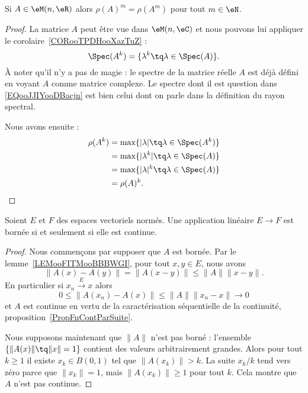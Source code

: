 \begin{proposition}     \label{PROPooYPLGooWKLbPA}
    Si \( A\in \eM(n,\eR)\) alors \( \rho(A)^m=\rho(A^m)\) pour tout \( m\in \eN\).
\end{proposition}

\begin{proof}
    La matrice \( A\) peut être vue dans \( \eM(n,\eC)\) et nous pouvons lui appliquer le corolaire~\ref{CORooTPDHooXazTuZ} :
    \begin{equation}        \label{EQooJJIYooDBacjn}
        \Spec(A^k)=\{ \lambda^k\tq \lambda\in\Spec(A) \}.
    \end{equation}
    À noter qu'il n'y a pas de magie : le spectre de la matrice réelle \( A\) est déjà défini en voyant \( A\) comme matrice complexe. Le spectre dont il est question dans \eqref{EQooJJIYooDBacjn} est bien celui dont on parle dans la définition du rayon spectral.

    Nous avons ensuite :
    \begin{subequations}
        \begin{align}
            \rho(A^k)&=\max\{ | \lambda |\tq \lambda\in\Spec(A^k) \}\\
            &=\max\{ | \lambda^k |\tq \lambda\in\Spec(A) \}\\
            &=\max\{ | \lambda |^k\tq\lambda\in\Spec(A) \}\\
            &=\rho(A)^k.
        \end{align}
    \end{subequations}
\end{proof}

\begin{proposition}       \label{PROPooQZYVooYJVlBd}
    Soient \( E\) et \( F\) des espaces vectoriels normés. Une application linéaire \( E\to F\) est bornée si et seulement si elle est continue.
\end{proposition}

\begin{proof}
    Nous commençons par supposer que \( A\) est bornée. Par le lemme~\ref{LEMooFITMooBBBWGI}, pour tout \( x,y\in E\), nous avons
    \begin{equation}
        \| A(x)-A(y) \|=\| A(x-y) \|\leq \| A \|\| x-y \|.
    \end{equation}
    En particulier si \( x_n\stackrel{E}{\longrightarrow}x\) alors
    \begin{equation}
        0\leq \| A(x_n)-A(x) \|\leq \| A \|\| x_n-x \|\to 0
    \end{equation}
    et \( A\) est continue en vertu de la caractérisation séquentielle de la continuité, proposition~\ref{PropFnContParSuite}.

    Nous supposons maintenant que \( \| A \|\) n'est pas borné : l'ensemble \( \{ \| A(x) \|\tq \| x \|=1 \}\) contient des valeurs arbitrairement grandes. Alors pour tout \( k\geq 1\) il existe \( x_k\in B(0,1)\) tel que \( \| A(x_k) \|>k\). La suite \( x_k/k\) tend vers zéro parce que \( \| x_k \|=1\), mais \( \| A(x_k) \|\geq 1\) pour tout \( k\). Cela montre que \( A\) n'est pas continue.
\end{proof}

